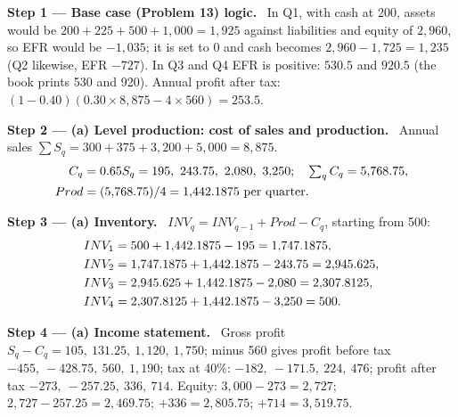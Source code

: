 \documentclass[11pt,a4paper]{article}
\newcommand{\step}[2]{\par\medskip\noindent\textbf{Step #1 --- #2.}~}
\begin{document}
\step{1}{Base case (Problem 13) logic}
In Q1, with cash at 200, assets would be $200 + 225 + 500 + 1{,}000 = 1{,}925$ against liabilities
and equity of $2{,}960$, so EFR would be $-1{,}035$; it is set to 0 and cash becomes $2{,}960 -
1{,}725 = 1{,}235$ (Q2 likewise, EFR $-727$). In Q3 and Q4 EFR is positive: $530.5$ and $920.5$
(the book prints 530 and 920). Annual profit after tax: $(1-0.40)(0.30 \times 8{,}875 - 4 \times
560) = 253.5$.

\step{2}{(a) Level production: cost of sales and production}
Annual sales $\sum S_q = 300 + 375 + 3{,}200 + 5{,}000 = 8{,}875$.
\begin{align}
  C_q &= 0.65 S_q = 195,\ 243.75,\ 2{,}080,\ 3{,}250; \quad \textstyle\sum_q C_q = 5{,}768.75, \notag\\
  Prod &= (5{,}768.75)/4 = 1{,}442.1875 \ \text{per quarter}. \notag
\end{align}

\step{3}{(a) Inventory}
$INV_q = INV_{q-1} + Prod - C_q$, starting from 500:
\begin{align}
  INV_1 &= 500 + 1{,}442.1875 - 195 = 1{,}747.1875, \notag\\
  INV_2 &= 1{,}747.1875 + 1{,}442.1875 - 243.75 = 2{,}945.625, \notag\\
  INV_3 &= 2{,}945.625 + 1{,}442.1875 - 2{,}080 = 2{,}307.8125, \notag\\
  INV_4 &= 2{,}307.8125 + 1{,}442.1875 - 3{,}250 = 500. \notag
\end{align}

\step{4}{(a) Income statement}
Gross profit $S_q - C_q = 105,\ 131.25,\ 1{,}120,\ 1{,}750$; minus 560 gives profit before tax
$-455,\ -428.75,\ 560,\ 1{,}190$; tax at 40\%: $-182,\ -171.5,\ 224,\ 476$; profit after tax
$-273,\ -257.25,\ 336,\ 714$. Equity: $3{,}000 - 273 = 2{,}727$; $2{,}727 - 257.25 = 2{,}469.75$;
$+336 = 2{,}805.75$; $+714 = 3{,}519.75$.
\end{document}
